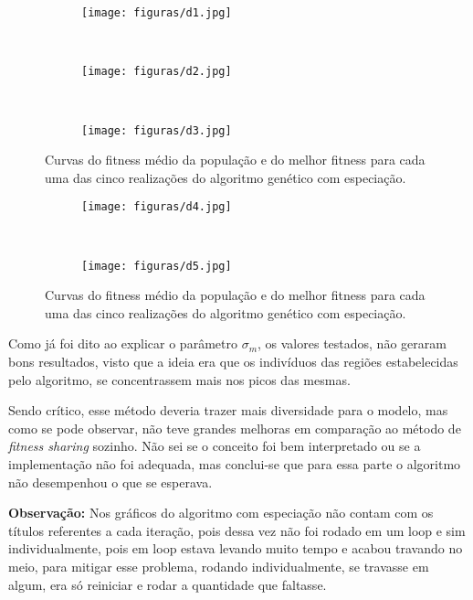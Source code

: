 \documentclass[a4paper, 12pt]{article}
\newcommand{\fitsha}{\textit{fitness sharing}\xspace}
\begin{document}
\begin{figure}[!ht]
\centering
\begin{subfigure}{0.8\textwidth}
    \texttt{[image: figuras/d1.jpg]}
\end{subfigure}
\hfill
\\
\centering
\begin{subfigure}{0.8\textwidth}
    \texttt{[image: figuras/d2.jpg]}
\end{subfigure}
\hfill
\\
\centering
\begin{subfigure}{0.8\textwidth}
    \texttt{[image: figuras/d3.jpg]}
\end{subfigure}
\hfill
\caption{Curvas do fitness médio da população e do melhor fitness para cada uma das cinco realizações do algoritmo genético com especiação.}
\label{fig:curvas5}
\end{figure}
\begin{figure}[!ht]
\centering
\begin{subfigure}{0.8\textwidth}
    \texttt{[image: figuras/d4.jpg]}
\end{subfigure}
\hfill
\\
\centering
\begin{subfigure}{0.8\textwidth}
    \texttt{[image: figuras/d5.jpg]}
\end{subfigure}
\hfill
\caption{Curvas do fitness médio da população e do melhor fitness para cada uma das cinco realizações do algoritmo genético com especiação.}
\label{fig:curvas6}
\end{figure}

Como já foi dito ao explicar o parâmetro $\sigma_m$, os valores testados, não geraram bons resultados, visto que a ideia era que os indivíduos das regiões estabelecidas pelo algoritmo, se concentrassem mais nos picos das mesmas.

Sendo crítico, esse método deveria trazer mais diversidade para o modelo, mas como se pode observar, não teve grandes melhoras em comparação ao método de \fitsha sozinho. Não sei se o conceito foi bem interpretado ou se a implementação não foi adequada, mas conclui-se que para essa parte o algoritmo não desempenhou o que se esperava.

\textbf{Observação:} Nos gráficos do algoritmo com especiação não contam com os títulos referentes a cada iteração, pois dessa vez não foi rodado em um loop e sim individualmente, pois em loop estava levando muito tempo e acabou travando no meio, para mitigar esse problema, rodando individualmente, se travasse em algum, era só reiniciar e rodar a quantidade que faltasse.

\clearpage





 
\end{document}
